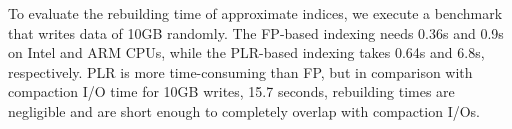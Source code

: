 To evaluate the rebuilding time of approximate indices, 
we execute a benchmark that writes data of 10GB randomly.
The FP-based indexing needs 0.36s and 0.9s on Intel and ARM CPUs,
while the PLR-based indexing takes 0.64s and 6.8s, respectively.
PLR is more time-consuming than FP,
but in comparison with compaction I/O time for 10GB writes, 15.7
seconds, rebuilding times are negligible and 
are short enough to completely overlap with compaction I/Os.

